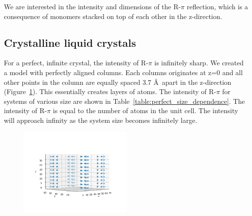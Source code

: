 \documentclass{article}
\begin{document}
  We are interested in the intensity and dimensions of the R-$\pi$ reflection,
  which is a consequence of monomers stacked on top of each other in the
  z-direction.

  \subsection{Crystalline liquid crystals}

  For a perfect, infinite crystal, the intensity of R-$\pi$ is infinitely sharp. We
  created a model with perfectly aligned columns. Each columns originates at z=0
  and all other points in the column are equally spaced 3.7 \AA~apart in the
  z-direction (Figure~\ref{fig:perfect_crystal_xyz}). This essentially creates
  layers of atoms. The intensity of R-$\pi$ for systems of various size are shown
  in Table~\ref{table:perfect_size_dependence}. The intensity of R-$\pi$ is equal
  to the number of atoms in the unit cell. The intensity will approach infinity as
  the system size becomes infinitely large.  

  \begin{figure}[!htb]
  \centering
  \includegraphics[width=0.5\textwidth]{perfect_crystal_xyz.png}
  \caption{}\label{fig:perfect_crystal_xyz}
  \end{figure}
\end{document}
